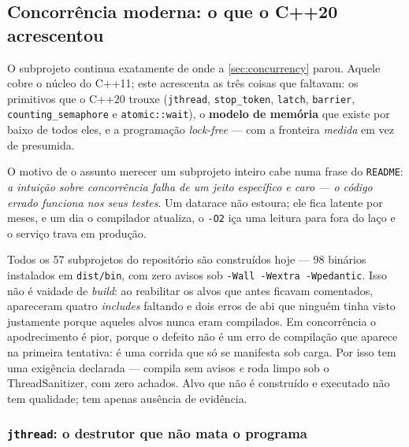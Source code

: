 \subsection{Concorrência moderna: o que o C++20 acrescentou}
\label{sec:concurrency2}

O subprojeto  continua exatamente de onde a
\cref{sec:concurrency} parou. Aquele cobre o núcleo do C++11; este acrescenta as
três coisas que faltavam: os primitivos que o C++20 trouxe (\texttt{jthread},
\texttt{stop\_token}, \texttt{latch}, \texttt{barrier},
\texttt{counting\_semaphore} e \texttt{atomic::wait}), o \textbf{modelo de
memória} que existe por baixo de todos eles, e a programação
\emph{lock-free} --- com a fronteira \emph{medida} em vez de presumida.

O motivo de o assunto merecer um subprojeto inteiro cabe numa frase do
\texttt{README}: \emph{a intuição sobre concorrência falha de um jeito
específico e caro --- o código errado funciona nos seus testes}. Um
\gls{datarace} não estoura; ele fica latente por meses, e um dia o compilador
atualiza, o \texttt{-O2} iça uma leitura para fora do laço e o serviço trava em
produção.

\begin{regra}
Todos os 57 subprojetos do repositório são construídos hoje --- 98 binários
instalados em \texttt{dist/bin}, com zero avisos sob
\texttt{-Wall -Wextra -Wpedantic}. Isso não é vaidade de \emph{build}: ao
reabilitar os alvos que antes ficavam comentados, apareceram quatro
\emph{includes} faltando e dois erros de \gls{abi} que ninguém tinha visto
justamente porque aqueles alvos nunca eram compilados. Em concorrência o
apodrecimento é pior, porque o defeito não é um erro de compilação que aparece
na primeira tentativa: é uma corrida que só se manifesta sob carga. Por isso
 tem uma exigência declarada --- compila sem avisos
\emph{e} roda limpo sob o ThreadSanitizer, com zero achados. Alvo que não é
construído e executado não tem qualidade; tem apenas ausência de evidência.
\end{regra}

\subsubsection{\texttt{jthread}: o destrutor que não mata o programa}

